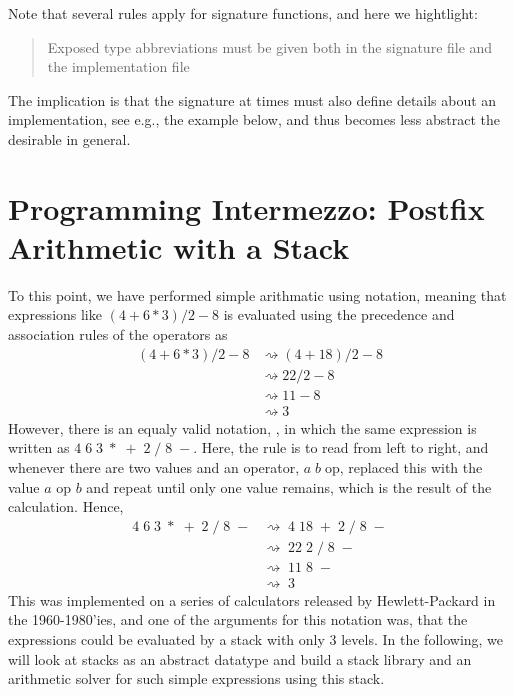\documentclass[fsharpNotes.tex]{subfiles}
\begin{document}
Note that several rules apply for signature functions, and here we hightlight:
\begin{quote}
Exposed type abbreviations must be given both in the signature file and the implementation file
\end{quote}
The implication is that the signature at times must also define details about an implementation, see e.g., the example below, and thus becomes less abstract the desirable in general.

\section{Programming Intermezzo: Postfix Arithmetic with a Stack}
To this point, we have performed simple arithmatic using  notation, meaning that expressions like $(4+6*3)/2-8$ is evaluated using the precedence and association rules of the operators as
\begin{align}
  (4+6*3)/2-8
  &\rightsquigarrow (4+18)/2-8\\
  &\rightsquigarrow 22/2-8\\
  &\rightsquigarrow 11-8\\
  &\rightsquigarrow 3
\end{align}
However, there is an equaly valid notation, , in which the same expression is written as $4\; 6\; 3\; *\; +\; 2\; /\; 8\; -$. Here, the rule is to read from left to right, and whenever there are two values and an operator, $a\; b\; \text{op}$, replaced this with the value $a \text{ op } b$ and repeat until only one value remains, which is the result of the calculation. Hence,
\begin{align}
  4\; 6\; 3\; *\; +\; 2\; /\; 8\; -
  &\rightsquigarrow\; 4\; 18\; +\; 2\; /\; 8\; -\\
  &\rightsquigarrow\; 22\; 2\; /\; 8\; -\\
  &\rightsquigarrow\; 11\; 8\; -\\
  &\rightsquigarrow\; 3
\end{align}
This was implemented on a series of calculators released by Hewlett-Packard in the 1960-1980'ies, and one of the arguments for this notation was, that the expressions could be evaluated by a stack with only 3 levels. In the following, we will look at stacks as an abstract datatype and build a stack library and an arithmetic solver for such simple expressions using this stack.
\end{document}
